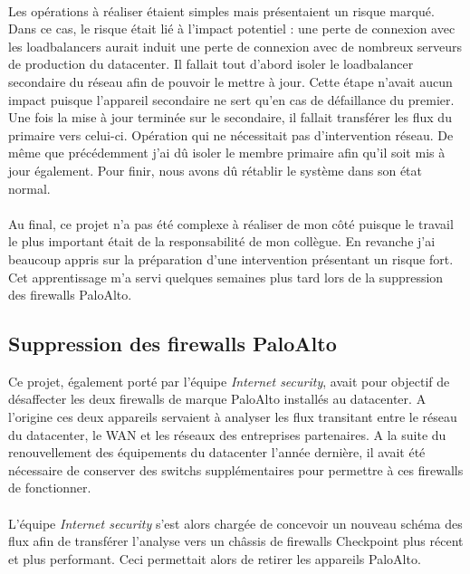 \documentclass[a4paper,12pt]{report}
\begin{document}
\paragraph{} 
Les opérations à réaliser étaient simples mais présentaient un risque marqué. Dans ce cas, le risque était lié à l'impact potentiel : une perte de connexion avec les loadbalancers aurait induit une perte de connexion avec de nombreux serveurs de production du datacenter. Il fallait tout d'abord isoler le loadbalancer secondaire du réseau afin de pouvoir le mettre à jour. Cette étape n'avait aucun impact puisque l'appareil secondaire ne sert qu'en cas de défaillance du premier. Une fois la mise à jour terminée sur le secondaire, il fallait transférer les flux du primaire vers celui-ci. Opération qui ne nécessitait pas d'intervention réseau. De même que précédemment j'ai dû isoler le membre primaire afin qu'il soit mis à jour également. Pour finir, nous avons dû rétablir le système dans son état normal.
\paragraph{}
Au final, ce projet n'a pas été complexe à réaliser de mon côté puisque le travail le plus important était de la responsabilité de mon collègue. En revanche j'ai beaucoup appris sur la préparation d'une intervention présentant un risque fort. Cet apprentissage m'a servi quelques semaines plus tard lors de la suppression des firewalls PaloAlto.

\subsection{Suppression des firewalls PaloAlto} \label{palo}
Ce projet, également porté par l'équipe \textit{Internet security}, avait pour objectif de désaffecter les deux firewalls de marque PaloAlto installés au datacenter. A l'origine ces deux appareils servaient à analyser les flux transitant entre le réseau du datacenter, le WAN et les réseaux des entreprises partenaires. A la suite du renouvellement des équipements du datacenter l'année dernière, il avait été nécessaire de conserver des switchs supplémentaires pour permettre à ces firewalls de fonctionner.
\paragraph{}
L'équipe \textit{Internet security} s'est alors chargée de concevoir un nouveau schéma des flux afin de transférer l'analyse vers un châssis de firewalls Checkpoint plus récent et plus performant. Ceci permettait alors de retirer les appareils PaloAlto.
\end{document}
